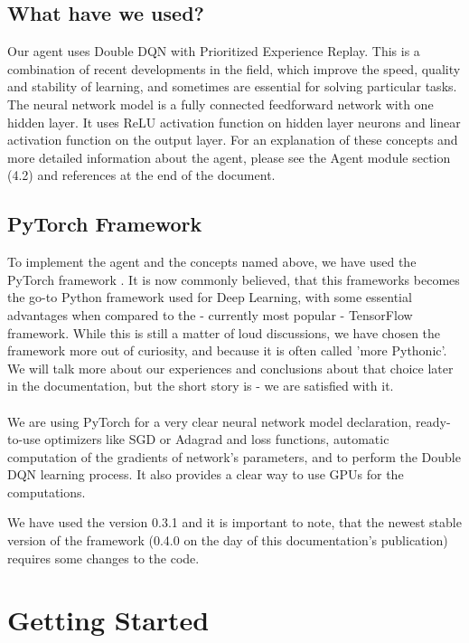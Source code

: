 \documentclass{article}
\begin{document}
\subsection{What have we used?}
Our agent uses Double DQN with Prioritized Experience Replay. This is a combination of recent developments in the field, which improve the speed, quality and stability of learning, and sometimes are essential for solving particular tasks. The neural network model is a fully connected feedforward network with one hidden layer. It uses ReLU activation function on hidden layer neurons and linear activation function on the output layer. For an explanation of these concepts and more detailed information about the agent, please see the Agent module section (4.2) and references at the end of the document.
\subsection{PyTorch Framework}
To implement the agent and the concepts named above, we have used the PyTorch framework \cite{pytorch}. It is now commonly believed, that this frameworks becomes the go-to Python framework used for Deep Learning, with some essential advantages when compared to the - currently most popular - TensorFlow framework. While this is still a matter of loud discussions, we have chosen the framework more out of curiosity, and because it is often called 'more Pythonic'. We will talk more about our experiences and conclusions about that choice later in the documentation, but the short story is - we are satisfied with it.
\\\\
We are using PyTorch for a very clear neural network model declaration, ready-to-use optimizers like SGD or Adagrad and loss functions, automatic computation of the gradients of network's parameters, and to perform the Double DQN learning process. It also provides a clear way to use GPUs for the computations. 

We have used the version 0.3.1 and it is important to note, that the newest stable version of the framework (0.4.0 on the day of this documentation's publication) requires some changes to the code.

\newpage
\section{Getting Started}
\end{document}
